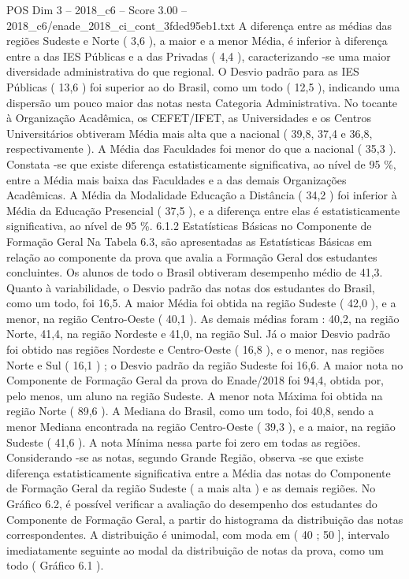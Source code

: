 \begin{textsample}{POS Dim 3 – 2018\_c6 – Score 3.00 – 2018\_c6/enade\_2018\_ci\_cont\_3fded95eb1.txt}
A diferença entre as médias das regiões Sudeste e Norte ( 3,6 ), a maior e a menor Média, é inferior à diferença entre a das IES Públicas e a das Privadas ( 4,4 ), caracterizando -se uma maior diversidade administrativa do que regional.
O Desvio padrão para as IES Públicas ( 13,6 ) foi superior ao do Brasil, como um todo ( 12,5 ), indicando uma dispersão um pouco maior das notas nesta Categoria Administrativa.
No tocante à Organização Acadêmica, os CEFET/IFET, as Universidades e os Centros Universitários obtiveram Média mais alta que a nacional ( 39,8, 37,4 e 36,8, respectivamente ).
A Média das Faculdades foi menor do que a nacional ( 35,3 ).
Constata -se que existe diferença estatisticamente significativa, ao nível de 95 \%, entre a Média mais baixa das Faculdades e a das demais Organizações Acadêmicas.
A Média da Modalidade Educação a Distância ( 34,2 ) foi inferior à Média da Educação Presencial ( 37,5 ), e a diferença entre elas é estatisticamente significativa, ao nível de 95 \%. 6.1.2 Estatísticas Básicas no Componente de Formação Geral Na Tabela 6.3, são apresentadas as Estatísticas Básicas em relação ao componente da prova que avalia a Formação Geral dos estudantes concluintes.
Os alunos de todo o Brasil obtiveram desempenho médio de 41,3.
Quanto à variabilidade, o Desvio padrão das notas dos estudantes do Brasil, como um todo, foi 16,5.
A maior Média foi obtida na região Sudeste ( 42,0 ), e a menor, na região Centro-Oeste ( 40,1 ).
As demais médias foram : 40,2, na região Norte, 41,4, na região Nordeste e 41,0, na região Sul.
Já o maior Desvio padrão foi obtido nas regiões Nordeste e Centro-Oeste ( 16,8 ), e o menor, nas regiões Norte e Sul ( 16,1 ) ; o Desvio padrão da região Sudeste foi 16,6.
A maior nota no Componente de Formação Geral da prova do Enade/2018 foi 94,4, obtida por, pelo menos, um aluno na região Sudeste.
A menor nota Máxima foi obtida na região Norte ( 89,6 ).
A Mediana do Brasil, como um todo, foi 40,8, sendo a menor Mediana encontrada na região Centro-Oeste ( 39,3 ), e a maior, na região Sudeste ( 41,6 ).
A nota Mínima nessa parte foi zero em todas as regiões.
Considerando -se as notas, segundo Grande Região, observa -se que existe diferença estatisticamente significativa entre a Média das notas do Componente de Formação Geral da região Sudeste ( a mais alta ) e as demais regiões.
No Gráfico 6.2, é possível verificar a avaliação do desempenho dos estudantes do Componente de Formação Geral, a partir do histograma da distribuição das notas correspondentes.
A distribuição é unimodal, com moda em ( 40 ; 50 ], intervalo imediatamente seguinte ao modal da distribuição de notas da prova, como um todo ( Gráfico 6.1 ).

\end{textsample}
